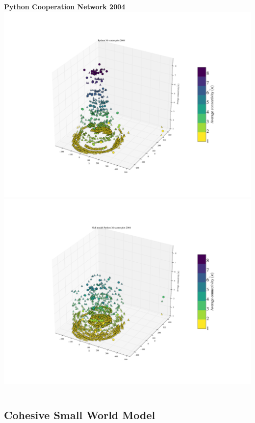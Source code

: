 \documentclass[ignorenonframetext,red,8pt,notes=show]{beamer}
\begin{document}
\begin{frame}
\begin{columns}[c]
\begin{column}{0.5\textwidth}
\begin{center}
\textbf{Python Cooperation Network 2004}
\includegraphics[scale=0.12]{../../figures/3d_scatter_python_2004}
\newline
\includegraphics[scale=0.12]{../../figures/3d_scatter_python_2004_null}
\end{center}
\end{column}
\end{columns}

\end{frame}

\subsection{Cohesive Small World Model}
\end{document}
